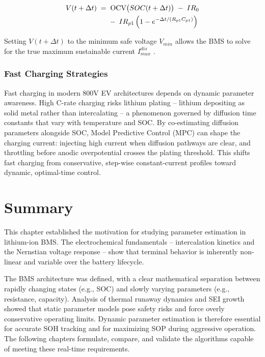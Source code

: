 \begin{align}
\label{eq:sop_dynamic}
V(t+\Delta t) \;=\; &\;\text{OCV}\big(SOC(t+\Delta t)\big) \;-\; I R_0 \notag \\
&-\; I R_{p1}\left(1 - e^{-\Delta t / (R_{p1}C_{p1})}\right)
\end{align}

Setting $V(t+\Delta t)$ to the minimum safe voltage $V_{min}$ allows the BMS to solve for the true maximum sustainable current $I_{max}^{dis}$ \cite{sun2015state}.

\subsubsection{Fast Charging Strategies}

Fast charging in modern 800V EV architectures depends on dynamic parameter awareness. High C-rate charging risks lithium plating -- lithium depositing as solid metal rather than intercalating -- a phenomenon governed by diffusion time constants that vary with temperature and SOC. By co-estimating diffusion parameters alongside SOC, Model Predictive Control (MPC) can shape the charging current: injecting high current when diffusion pathways are clear, and throttling before anodic overpotential crosses the plating threshold. This shifts fast charging from conservative, step-wise constant-current profiles toward dynamic, optimal-time control.



\section{Summary}
\label{sec:summary_ch1}

This chapter established the motivation for studying parameter estimation in lithium-ion BMS. The electrochemical fundamentals -- intercalation kinetics and the Nernstian voltage response -- show that terminal behavior is inherently non-linear and variable over the battery lifecycle.

The BMS architecture was defined, with a clear mathematical separation between rapidly changing states (e.g., SOC) and slowly varying parameters (e.g., resistance, capacity). Analysis of thermal runaway dynamics and SEI growth showed that static parameter models pose safety risks and force overly conservative operating limits. Dynamic parameter estimation is therefore essential for accurate SOH tracking and for maximizing SOP during aggressive operation. The following chapters formulate, compare, and validate the algorithms capable of meeting these real-time requirements.